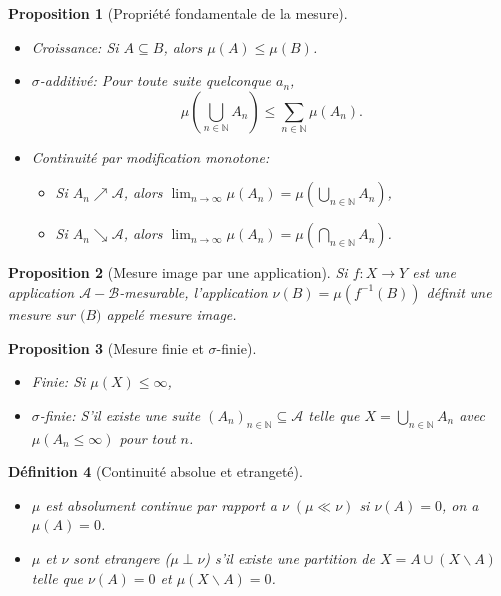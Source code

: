 \documentclass[a4paper,12pt,french]{report}
\theoremstyle{break}
\newtheorem{defin}{Définition}[section]
\newtheorem{prop}[defin]{Proposition}
\begin{document}
\begin{prop}[Propriété fondamentale de la mesure]
\begin{itemize}
       \item Croissance: Si $A \subseteq B$, alors $\mu (A) \leq \mu (B)$.
       \item $\sigma$-additivé: Pour toute suite quelconque $a_{n}$, $$\mu (\bigcup_{n \in \mathbb{N}} A_{n}) \leq \sum_{n \in \mathbb{N}} \mu (A_{n}).$$
       \item Continuité par modification monotone:
       \begin{itemize}
              \item Si $A_{n} \nearrow \mathcal{A}$, alors $\displaystyle \lim_{n \rightarrow \infty} \mu (A_{n}) = \mu (\bigcup_{n \in \mathbb{N}} A_{n})$, 
              \item Si $A_{n} \searrow \mathcal{A}$, alors $\displaystyle \lim_{n \rightarrow \infty} \mu (A_{n}) = \mu (\bigcap_{n \in \mathbb{N}} A_{n})$.
       \end{itemize}
\end{itemize}
\end{prop}

\begin{prop}[Mesure image par une application]
Si $f : X \rightarrow Y$ est une application $\mathcal{A}-\mathcal{B}$-mesurable, l'application $\nu (B) = \mu(f^{-1}(B))$ définit une mesure sur $\mathcal(B)$ appelé mesure image.
\end{prop}

\begin{prop}[Mesure finie et $\sigma$-finie]
\begin{itemize}
       \item Finie: Si $\mu (X) \le \infty$,
       \item $\sigma$-finie: S'il existe une suite $(A_{n})_{n \in \mathbb{N}} \subseteq \mathcal{A}$ telle que $X = \bigcup_{n \in \mathbb{N}} A_{n}$ avec $\mu (A_{n} \le \infty)$ pour tout $n$.
\end{itemize}
\end{prop}

\begin{defin}[Continuité absolue et etrangeté]
\begin{itemize}
       \item $\mu$ est absolument continue par rapport a $\nu \; (\mu \ll \nu)$ si $\nu(A) = 0$, on a $\mu (A) = 0$.
       \item $\mu$ et $\nu$ sont etrangere ($\mu \perp \nu$) s'il existe une partition de $X = A \cup (X \backslash A)$ telle que $\nu(A)=0$ et $\mu(X \backslash A) = 0$.
\end{itemize}
\end{defin}
\end{document}
